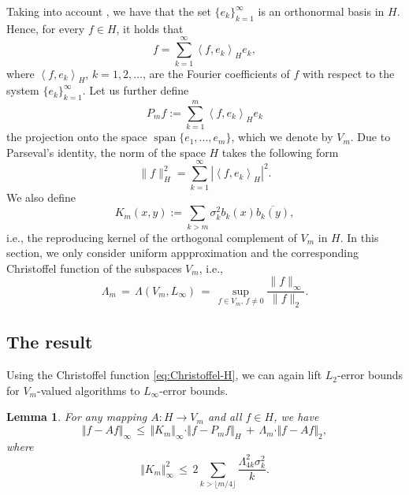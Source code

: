 \documentclass[a4paper,12pt]{amsart}
\newtheorem{lemma}[theorem]{Lemma}
\theoremstyle{definition}
\theoremstyle{remark}
\newcommand{\ipr}[2]{\left\langle#1,#2\right\rangle}
\begin{document}
 
 Taking into account \cite[Lemma 2.6]{Steinwart_Scovel2012},
 we have that the set $\{e_k\}_{k=1}^{\infty}$ 
is an orthonormal basis in $H$. 
 Hence, for every $f\in H$, it
  {holds that}
 \begin{equation*}%
 	f = \sum_{k=1}^{\infty} \ipr{f}{e_k}_{H} e_k,
 \end{equation*}
 where $\ipr{f}{e_k}_{H}$, $k=1, 2, \dots$, are the Fourier coefficients of $f$ with respect to the system $\{ e_k\}_{k=1}^{\infty}$. Let us further 
  {define}
 \begin{equation*}%
 	P_mf := \sum\limits_{k=1}^{m} \ipr{f}{e_k}_{H} e_k
 \end{equation*}
 the projection onto the space $\operatorname{span}\{e_1,...,e_{m}\}$,
which we denote by $V_m$.
 Due to Parseval's identity, the norm of the space $H$ takes the following form
 \begin{displaymath}
 	\|f\|^2_{H} =   \sum_{k=1}^{\infty} | \ipr{f}{e_k}_{H} |^2 .
 \end{displaymath}
We also define
 \[
  K_m(x,y) := \sum_{k>m} \sigma_k^2 b_k(x) \overline{b_k(y)},
 \]
 i.e., the reproducing kernel of the orthogonal complement of $V_m$ in $H$.
 {In this section, we only consider uniform appproximation and the corresponding Christoffel function of the subspaces $V_m$, i.e.,
 \begin{equation}\label{eq:Christoffel-H}
     \Lambda_m \,=\, \Lambda(V_m,L_\infty)
     \,=\, \sup\limits_{f \in V_m, \, f\neq 0} \frac{\|f\|_\infty}{\|f\|_2}.
 \end{equation}}


 \subsection{{The result}} 
 
Using the Christoffel function \eqref{eq:Christoffel-H},
 we can {again} lift $L_2$-error bounds
 for $V_m$-valued algorithms
 to $L_\infty$-error bounds.
 
 \begin{lemma}\label{lem:liftH}
 For any mapping $A\colon H \to V_m$ and all $f\in H$, we have
 \begin{equation}\label{eq:liftH}
  \Vert f - Af\Vert_\infty\,\le\, 
  \Vert K_m \Vert_\infty
  \cdot \Vert f-P_m f\Vert_{H}
  \,+\, \Lambda_m \cdot \Vert f-Af\Vert_2,
 \end{equation}
 where
 \[
 \Vert K_m \Vert_\infty^2
 \,\le\, 2 \sum\limits_{k> \lfloor m/4 \rfloor}\frac{\Lambda_{4k}^2\sigma_k^2}{k}.
 \]
 \end{lemma}
 
\end{document}
